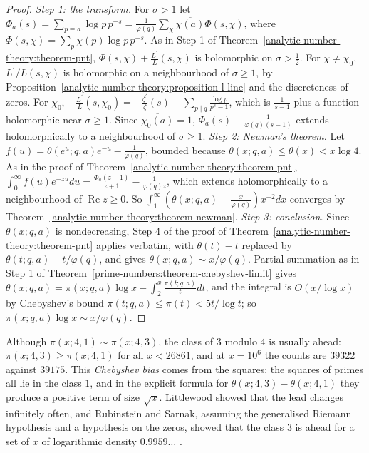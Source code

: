 \begin{proof}
\emph{Step 1: the transform.} For $\sigma > 1$ let $\Phi_a(s) = \sum_{p \equiv a}\log p\,p^{-s} = \frac{1}{\varphi(q)}\sum_\chi\overline{\chi(a)}\Phi(s, \chi)$, where
$\Phi(s, \chi) = \sum_p\chi(p)\log p\,p^{-s}$. As in Step 1 of Theorem~\ref{analytic-number-theory:theorem-pnt}, $\Phi(s, \chi) + \frac{L^{\prime}}{L}(s, \chi)$ is holomorphic on $\sigma > \frac12$. For
$\chi \neq \chi_0$, $L^{\prime}/L(s, \chi)$ is holomorphic on a neighbourhood of $\sigma \geq 1$, by Proposition~\ref{analytic-number-theory:proposition-l-line} and the discreteness of zeros. For
$\chi_0$, $-\frac{L^{\prime}}{L}(s, \chi_0) = -\frac{\zeta^{\prime}}{\zeta}(s) - \sum_{p \mid q}\frac{\log p}{p^s - 1}$, which is $\frac{1}{s - 1}$ plus a function holomorphic near $\sigma \geq 1$. Since
$\overline{\chi_0(a)} = 1$, $\Phi_a(s) - \frac{1}{\varphi(q)(s - 1)}$ extends holomorphically to a neighbourhood of $\sigma \geq 1$.
\emph{Step 2: Newman's theorem.} Let $f(u) = \theta(e^u; q, a)e^{-u} - \frac{1}{\varphi(q)}$, bounded because $\theta(x; q, a) \leq \theta(x) < x\log 4$. As in the proof of
Theorem~\ref{analytic-number-theory:theorem-pnt}, $\int_0^\infty f(u)e^{-zu}du = \frac{\Phi_a(z + 1)}{z + 1} - \frac{1}{\varphi(q)z}$, which extends holomorphically to a neighbourhood of
$\operatorname{Re}z \geq 0$. So $\int_1^\infty(\theta(x; q, a) - \frac{x}{\varphi(q)})x^{-2}dx$ converges by Theorem~\ref{analytic-number-theory:theorem-newman}.
\emph{Step 3: conclusion.} Since $\theta(x; q, a)$ is nondecreasing, Step 4 of the proof of Theorem~\ref{analytic-number-theory:theorem-pnt} applies verbatim, with $\theta(t) - t$ replaced by $\theta(t; q, a) - t/\varphi(q)$, and gives
$\theta(x; q, a) \sim x/\varphi(q)$. Partial summation as in Step 1 of Theorem~\ref{prime-numbers:theorem-chebyshev-limit} gives
$\theta(x; q, a) = \pi(x; q, a)\log x - \int_2^x\frac{\pi(t; q, a)}{t}dt$, and the integral is $O(x/\log x)$ by Chebyshev's bound $\pi(t; q, a) \leq \pi(t) < 5t/\log t$; so
$\pi(x; q, a)\log x \sim x/\varphi(q)$.
\end{proof}

\begin{example}\label{analytic-number-theory:example-chebyshev-bias}
Although $\pi(x; 4, 1) \sim \pi(x; 4, 3)$, the class of $3$ modulo $4$ is usually ahead: $\pi(x; 4, 3) \geq \pi(x; 4, 1)$ for all $x < 26861$, and at $x = 10^6$ the counts are $39322$ against $39175$. This
\emph{Chebyshev bias} comes from the squares: the squares of primes all lie in the class $1$, and in the explicit formula for $\theta(x; 4, 3) - \theta(x; 4, 1)$ they produce a positive term of size
$\sqrt{x}$. Littlewood showed that the lead changes infinitely often, and Rubinstein and Sarnak, assuming the generalised Riemann hypothesis and a hypothesis on the zeros, showed that the class
$3$ is ahead for a set of $x$ of logarithmic density $0.9959\ldots$ \cite{rubinstein-sarnak}.
\end{example}

